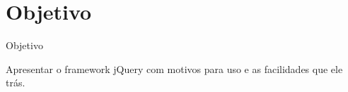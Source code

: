 \section{Objetivo}
\begin{frame}{Objetivo}

Apresentar o framework jQuery com motivos para uso e as facilidades que ele trás.

\end{frame}
